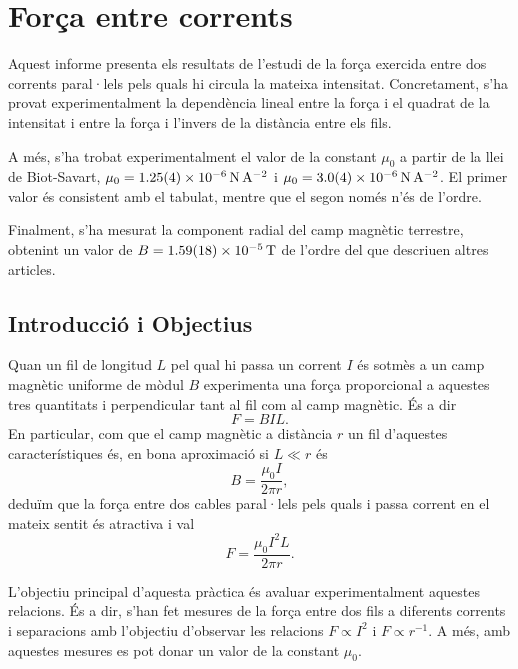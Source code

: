 \chapter{Força entre corrents}
\begin{resum}
	Aquest informe presenta els resultats de l'estudi de la força exercida entre dos corrents paral·lels pels quals hi circula la mateixa intensitat. Concretament, s'ha provat experimentalment la dependència lineal entre la força i el quadrat de la intensitat i entre la força i l'invers de la distància entre els fils.

	A més, s'ha trobat experimentalment el valor de la constant \( \mu_0 \) a partir de la llei de Biot-Savart, \( \mu_0 = \data{1.25}{0.04e-6}{N.A^{-2}} \) i \( \mu_0 = \data{3.0}{0.4d-6}{N.A^{-2}} \). El primer valor és consistent amb el tabulat, mentre que el segon només n'és de l'ordre. 

	Finalment, s'ha mesurat la component radial del camp magnètic terrestre, obtenint un valor de \( B = \data{1.59}{0.18d-5}{T} \) de l'ordre del que descriuen altres articles.
\end{resum}

	\section{Introducció i Objectius}
	Quan un fil de longitud \( L \) pel qual hi passa un corrent \( I \) és sotmès a un camp magnètic uniforme de mòdul \( B \) experimenta una força proporcional a aquestes tres quantitats i perpendicular tant al fil com al camp magnètic. És a dir
	\begin{equation} \label{eq:forca magnetica} 
		F = BIL.
	\end{equation}
	En particular, com que el camp magnètic a distància \( r \) un fil d'aquestes característiques és, en bona aproximació si \( L \ll r \) és
	\begin{equation*}
		B = \frac{\mu_0 I}{2\pi r},
	\end{equation*}
	deduïm que la força entre dos cables paral·lels pels quals i passa corrent en el mateix sentit és atractiva i val
	\begin{equation} \label{eq:forca i corrent}
		F = \frac{\mu_0I^2L}{2\pi r}.
	\end{equation}

	L'objectiu principal d'aquesta pràctica és avaluar experimentalment aquestes relacions. És a dir, s'han fet mesures de la força entre dos fils a diferents corrents i separacions amb l'objectiu d'observar les relacions \( F \propto I^2 \) i \( F \propto r^{-1} \). A més, amb aquestes mesures es pot donar un valor de la constant \( \mu_0 \).  

